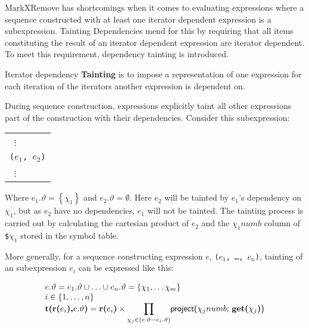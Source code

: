 MarkXRemove has shortcomings when it comes to evaluating expressions where a
sequence constructed with at least one iterator dependent expression is a subexpression. Tainting Dependencies mend for this by requiring that
all items constituting the result of an iterator dependent expression are
iterator dependent. To meet this requirement, dependency tainting is
introduced.

\noindent
\begin{myDefinition}
Iterator dependency \textbf{Tainting} is to impose a representation of one expression for each iteration of the
iterators another expression is dependent on.
\end{myDefinition}

During sequence construction, expressions explicitly taint all other expressions part of the construction with
their dependencies. Consider this subexpression:
\begin{center}
\begin{tabular}{l}
\quad \;\, $\vdots$  \\
\texttt{(}$e_{1}$\texttt{, }$e_{2}$\texttt{)}\\
\quad \;\, $\vdots$  
\end{tabular}
\end{center}
Where $e_{1}.\vartheta = \left\{\chi_{1}\right\}$ and $e_{2}.\vartheta = \emptyset$. Here $e_{2}$ will be tainted
by $e_{1}$'s dependency on $\chi_{1}$, but as $e_{2}$ have no dependencies, $e_{1}$ will not be tainted. The
tainting process is carried out by calculating the cartesian product of $e_{2}$ and the $\chi_{1}$$numb$ column of
\texttt{\$}$\chi_{1}$ stored in the symbol table.

More generally, for a sequence constructing expression $e$, \texttt{(}$e_{1}$\texttt{, \ldots, }$e_{n}$\texttt{)},
tainting of an subexpression $e_{i}$ can be expressed like this: 
\begin{center}
\begin{equation}
\begin{array}{l}
e.\vartheta = e_{1}.\vartheta \cup \ldots \cup e_{n}.\vartheta = \left\{\chi_{1},\ldots\chi_{m}\right\} \\
i \in \left\{1,\ldots,n\right\} \\
\mbox{\textbf{t(r(}}e_{i}\mbox{\textbf{),}}e.\vartheta\mbox{\textbf{)}} = 
\mbox{\textbf{r(}}e_{i}\mbox{\textbf{)}} \times {\displaystyle \prod_{\chi_{j} \in (e.\vartheta -
e_{i}.\vartheta)}} \mbox{\textsf{project(}}\chi_{j}numb\mbox{\textsf{;
}\textbf{get(}}\chi_{j}\mbox{\textbf{)}\textsf{)}}
\end{array}
\label{eq:trans:TD:taint}
\end{equation}
\end{center}

